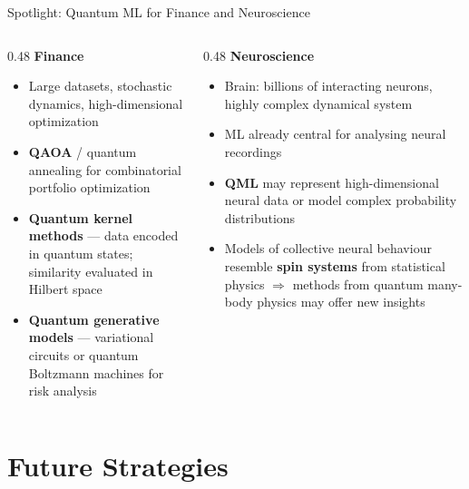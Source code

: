 \documentclass[aspectratio=169]{beamer}
\begin{document}
\begin{frame}{Spotlight: Quantum ML for Finance and Neuroscience}

  \begin{columns}[T]
    \begin{column}{0.48\textwidth}
      \textbf{Finance}
      \begin{itemize}
        \item Large datasets, stochastic dynamics,
              high-dimensional optimization
        \item \textbf{QAOA} / quantum annealing for combinatorial
              portfolio optimization
        \item \textbf{Quantum kernel methods} — data encoded in
              quantum states; similarity evaluated in Hilbert space
        \item \textbf{Quantum generative models} — variational circuits
              or quantum Boltzmann machines for risk analysis
      \end{itemize}
    \end{column}
    \begin{column}{0.48\textwidth}
      \textbf{Neuroscience}
      \begin{itemize}
        \item Brain: billions of interacting neurons, highly complex
              dynamical system
        \item ML already central for analysing neural recordings
        \item \textbf{QML} may represent high-dimensional neural data
              or model complex probability distributions
        \item Models of collective neural behaviour resemble
              \textbf{spin systems} from statistical physics
              $\Rightarrow$ methods from quantum many-body physics
              may offer new insights
      \end{itemize}
    \end{column}
  \end{columns}

\end{frame}

\section{Future Strategies}
\end{document}
